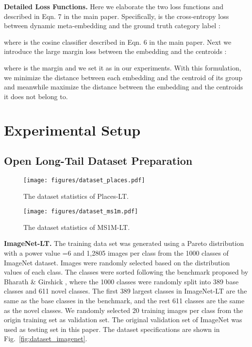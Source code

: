 \documentclass[10pt,twocolumn,letterpaper]{article}
\begin{document}
\vspace{2pt}
\noindent
\textbf{Detailed Loss Functions.}
Here we elaborate the two loss functions  and  described in Eqn. 7 in the main paper.
Specifically,  is the cross-entropy loss between dynamic meta-embedding  and the ground truth category label :

where  is the cosine classifier described in Eqn. 6 in the main paper.
Next we introduce the large margin loss  between the embedding  and the centroids :

where  is the margin and we set it as  in our experiments. With this formulation, we minimize the distance between each embedding and the centroid of its group and meanwhile maximize the distance between the embedding and the centroids it does not belong to.



\section{Experimental Setup}
\label{sec:experimental}

\subsection{Open Long-Tail Dataset Preparation}

\begin{figure*}[t]
  \centering
  \texttt{[image: figures/dataset\_places.pdf]}
  \vspace{-6pt}
  \caption{The dataset statistics of Places-LT.}
  \label{fig:dataset_places}
  \vspace{-10pt}
\end{figure*}

\begin{figure*}[t]
  \centering
  \texttt{[image: figures/dataset\_ms1m.pdf]}
  \vspace{-2pt}
  \caption{The dataset statistics of MS1M-LT.}
  \label{fig:dataset_ms1m}
  \vspace{-10pt}
\end{figure*}

\vspace{2pt}
\noindent
\textbf{ImageNet-LT.} 
The training data set was generated using a Pareto distribution~\cite{reed2001pareto} with a power value =6 and 1,2805 images per class from the 1000 classes of ImageNet dataset. Images were randomly selected based on the distribution values of each class. The classes were sorted following the benchmark proposed by Bharath \& Girshick \cite{hariharan2017low}, where the 1000 classes were randomly split into 389 base classes and 611 novel classes. The first 389 largest classes in ImageNet-LT are the same as the base classes in the benchmark, and the rest 611 classes are the same as the novel classes. We randomly selected 20 training images per class from the origin training set as validation set. The original validation set of ImageNet was used as testing set in this paper. The dataset specifications are shown in Fig.~\ref{fig:dataset_imagenet}. 
\end{document}
